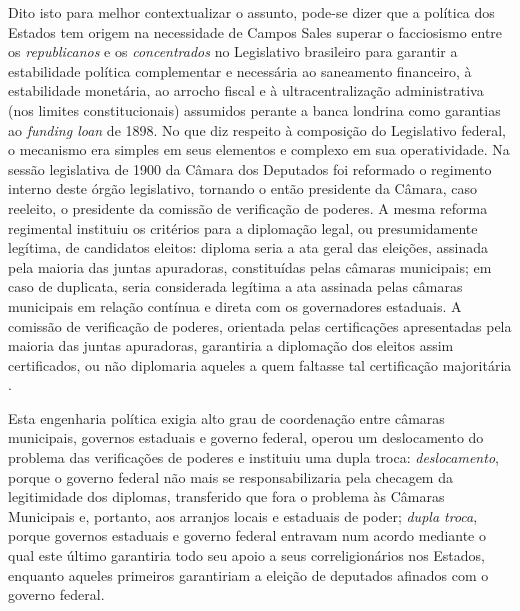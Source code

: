Dito isto para melhor contextualizar o assunto, pode-se dizer que a política dos Estados tem origem na necessidade de Campos Sales superar o facciosismo entre os \textit{republicanos} e os \textit{concentrados} no Legislativo brasileiro para garantir a estabilidade política complementar e necessária ao saneamento financeiro, à estabilidade monetária, ao arrocho fiscal e à ultracentralização administrativa (nos limites constitucionais) assumidos perante a banca londrina como garantias ao \textit{funding loan} de 1898. No que diz respeito à composição do Legislativo federal, o mecanismo era simples em seus elementos e complexo em sua operatividade. Na sessão legislativa de 1900 da Câmara dos Deputados foi reformado o regimento interno deste órgão legislativo, tornando o então presidente da Câmara, caso reeleito, o presidente da comissão de verificação de poderes. A mesma reforma regimental instituiu os critérios para a diplomação legal, ou presumidamente legítima, de candidatos eleitos: diploma seria a ata geral das eleições, assinada pela maioria das juntas apuradoras, constituídas pelas câmaras municipais; em caso de duplicata, seria considerada legítima a ata assinada pelas câmaras municipais em relação contínua e direta com os governadores estaduais. A comissão de verificação de poderes, orientada pelas certificações apresentadas pela maioria das juntas apuradoras, garantiria a diplomação dos eleitos assim certificados, ou não diplomaria aqueles a quem faltasse tal certificação majoritária \cite{carone_textcontext_1973, carone_evolucao_1977, silva_opodercivil_1975}.

Esta engenharia política exigia alto grau de coordenação entre câmaras municipais, governos estaduais e governo federal, operou um deslocamento do problema das verificações de poderes e instituiu uma dupla troca: \textit{deslocamento}, porque o governo federal não mais se responsabilizaria pela checagem da legitimidade dos diplomas, transferido que fora o problema às Câmaras Municipais e, portanto, aos arranjos locais e estaduais de poder; \textit{dupla troca}, porque governos estaduais e governo federal entravam num acordo mediante o qual este último garantiria todo seu apoio a seus correligionários nos Estados, enquanto aqueles primeiros garantiriam a eleição de deputados afinados com o governo federal.

